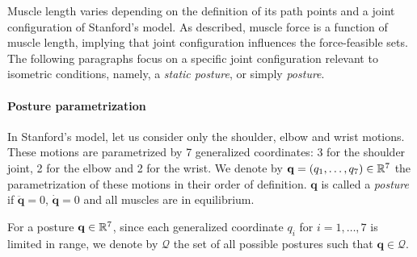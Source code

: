 Muscle length varies depending on the definition of its path points and a joint configuration of Stanford's model. As described, muscle force is a function of muscle length, implying that joint configuration influences the force-feasible sets. The following paragraphs focus on a specific joint configuration relevant to isometric conditions, namely, a \emph{static posture}, or simply \emph{posture}.

\paragraph*{Posture parametrization}
In Stanford's model, let us consider only the shoulder, elbow and wrist motions. These motions are parametrized by 7 generalized coordinates: 3 for the shoulder joint, 2 for the elbow and 2 for the wrist. We denote by $\mathbf{q} = (q_1, \dots, q_7)\in\mathbb{R}^7$ the parametrization of these motions in their order of definition. $\mathbf{q}$ is called a \emph{posture} if $\ddot{\mathbf{q}} = 0$, $\dot{\mathbf{q}} = 0$ and all muscles are in equilibrium. 

For a posture $\mathbf{q}\in\mathbb{R}^7$, since each generalized coordinate $q_i$ for $i = 1, \dots, 7$ is limited in range, we denote by $\mathcal{Q}$ the set of all possible postures such that $\mathbf{q}\in\mathcal{Q}$. 

